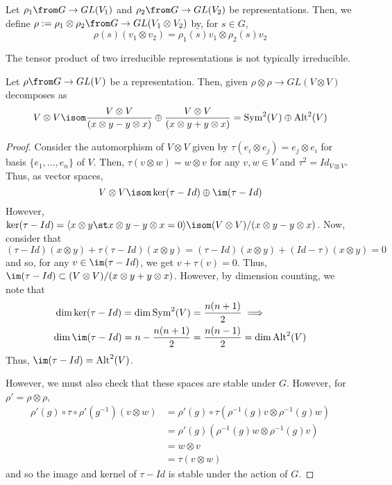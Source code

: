 \documentclass[11pt,leqno,oneside]{amsbook}
\numberwithin{thm}{section}
\begin{document}
\begin{defn}
  Let \(\rho_1 \from G \to GL(V_1)\) and \(\rho_2 \from G \to
  GL(V_2)\) be representations. Then, we define \(\rho := \rho_1
  \otimes \rho_2 \from G \to GL(V_1 \otimes V_2)\) by, for \(s \in G\), \[
    \rho(s)(v_1 \otimes v_2) = \rho_1(s)v_1 \otimes \rho_2(s) v_2
  \]
\end{defn}
\begin{rmk}
  The tensor product of two irreducible representations is not
  typically irreducible. 
\end{rmk}
\begin{thm}
  Let \(\rho \from G \to GL(V)\) be a representation. Then, given
  \(\rho \otimes \rho \to GL(V \otimes V)\) decomposes as \[
    V \otimes V \isom \frac{V \otimes V}{(x \otimes y - y \otimes x)} \oplus
    \frac{V \otimes V}{(x \otimes y + y \otimes x)} =
    \operatorname{Sym}^2(V) \oplus \operatorname{Alt}^2(V)
  \]
\end{thm}
\begin{proof}
  Consider the automorphism of \(V \otimes V\) given by \(\tau(e_i
  \otimes e_j) = e_j \otimes e_i\) for basis \(\{e_1, \ldots, e_n\}\)
  of \(V\). Then, \(\tau(v \otimes w) = w \otimes v\) for any \(v,w
  \in V\) and \(\tau^2 = Id_{V \otimes V}\). Thus, as vector spaces, \[
    V \otimes V \isom  \ker (\tau-Id) \oplus \im (\tau-Id) 
  \]
  However, \(\ker(\tau-Id) = \langle x \otimes y \st x \otimes y - y
  \otimes x = 0 \rangle \isom (V \otimes V)/(x \otimes y - y \otimes
  x)\). Now, consider that \[
    (\tau-Id)(x \otimes y) + \tau(\tau-Id)(x \otimes y) = (\tau-Id)(x
    \otimes y) + (Id - \tau)(x \otimes y) = 0
  \]
  and so, for any \(v \in \im(\tau-Id)\), we get \(v + \tau(v) =
  0\). Thus, \(\im(\tau-Id) \subset (V \otimes V)/(x \otimes y + y
  \otimes x)\). However, by dimension counting, we note that
  \begin{align*}
        \dim \ker(\tau-Id) = \dim \operatorname{Sym}^2(V) &= \frac{n(n+1)}{2} \implies \\ \dim
    \im(\tau-Id) = n - \frac{n(n+1)}{2} &= \frac{n(n-1)}{2} = \dim \operatorname{Alt}^2(V)
  \end{align*}
  Thus, \(\im(\tau-Id) = \operatorname{Alt}^2(V)\).

  However, we must also check that these spaces are stable under
  \(G\). However, for \(\rho' = \rho \otimes \rho\),
  \begin{align*}
    \rho'(g) \circ \tau \circ \rho'(g^{-1}) (v \otimes w)
    & = \rho'(g)
      \circ \tau (\rho^{-1}(g)v \otimes \rho^{-1}(g)w) \\
    & = \rho'(g)(\rho^{-1}(g)w \otimes \rho^{-1}(g)v) \\
    & = w \otimes v \\
    & = \tau(v \otimes w)
  \end{align*}
  and so the image and kernel of \(\tau-Id\) is stable under the
  action of \(G\).
\end{proof}
\end{document}
